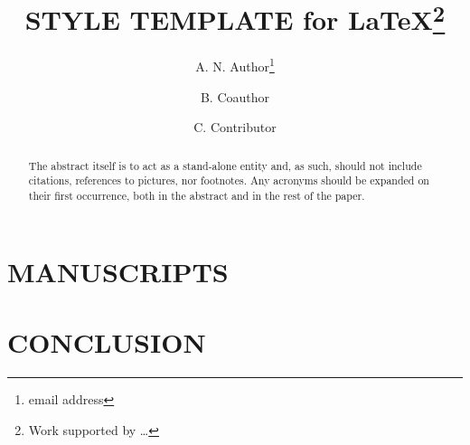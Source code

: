 \documentclass[%
               biblatex,     %
               ]{jacow}
\begin{document}
\title{ STYLE TEMPLATE for \LaTeX\thanks{Work supported by …}}

\author[1]{A. N. Author\thanks{email address}}
\author[1,2]{B. Coauthor}
\author[2]{C. Contributor}

\maketitle

\begin{abstract}
	The abstract itself is to act as a stand-alone entity and, as such, 
	should not include citations, references to pictures, nor footnotes.
	Any acronyms should be expanded on their first occurrence, 
	both in the abstract and in the rest of the paper.
\end{abstract}

\section{MANUSCRIPTS}




\section{CONCLUSION}




\printbibliography
\end{document}
